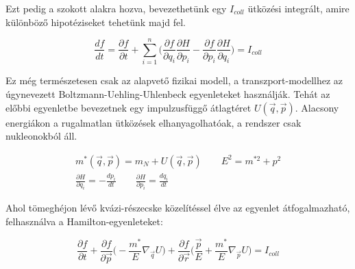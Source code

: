 \documentclass[a4paper,12pt]{article}
\begin{document}
\vspace{5mm}

\par Ezt pedig a szokott alakra hozva, bevezethetünk egy $I_{coll}$ ütközési integrált, amire különböző hipotéziseket tehetünk majd fel.

\vspace{5mm}

\begin{equation}
	\frac{df}{dt} = \frac{\partial f}{\partial t} + \sum_{i = 1}^{n}\Big(\frac{\partial f}{\partial q_{i}}\frac{\partial H}{\partial p_{i}} - \frac{\partial f}{\partial p_{i}}\frac{\partial H}{\partial q_{i}}\Big) = I_{coll}
\end{equation}

\vspace{5mm}

\par Ez még természetesen csak az alapvető fizikai modell, a transzport-modellhez az úgynevezett Boltzmann-Uehling-Uhlenbeck egyenleteket használják. Tehát az előbbi egyenletbe bevezetnek egy impulzusfüggő átlagtéret $U(\vec{q}, \vec{p})$. Alacsony energiákon a rugalmatlan ütközések elhanyagolhatóak, a rendszer csak nukleonokból áll. 

\vspace{5mm}
	
\begin{gather}
	m^{*}(\vec{q}, \vec{p}) = m_{N} + U(\vec{q}, \vec{p}) \quad \quad E^{2} = m^{* 2} + p^{2} \\ 
	\frac{\partial H}{\partial q_{i}} = -\frac{dp_{i}}{dt} \quad \quad \frac{\partial H}{\partial p_{i}} =\frac{dq_{i}}{dt}
\end{gather}

\vspace{5mm}
	
\par Ahol tömeghéjon lévő kvázi-részecske közelítéssel élve az egyenlet átfogalmazható, felhasználva a Hamilton-egyenleteket:

\vspace{5mm}

\begin{equation} \label{BUU-eq:1}
	\frac{\partial f}{\partial t} + \frac{\partial f}{\partial \vec{p}}\Big(-\frac{m^{*}}{E}\nabla_{\vec{q}}U\Big) + \frac{\partial f}{\partial \vec{r}}\Big(\frac{\vec{p}}{E}+\frac{m^{*}}{E}\nabla_{\vec{p}}U\Big) = I_{coll}
\end{equation}

\vspace{5mm}
\end{document}
